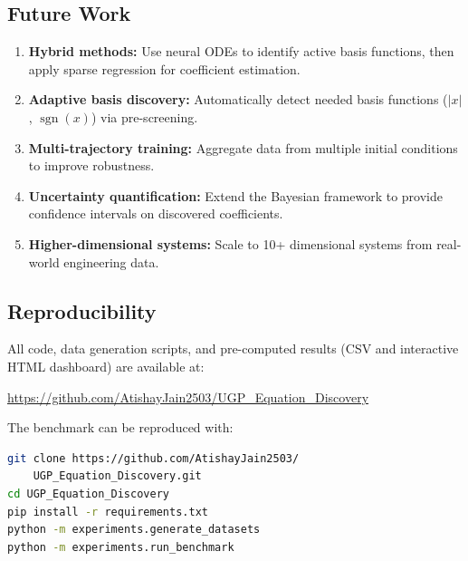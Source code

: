\subsection{Future Work}
\begin{enumerate}
    \item \textbf{Hybrid methods:} Use neural ODEs to identify active basis functions, then apply sparse regression for coefficient estimation.
    \item \textbf{Adaptive basis discovery:} Automatically detect needed basis functions ($|x|$, $\operatorname{sgn}(x)$) via pre-screening.
    \item \textbf{Multi-trajectory training:} Aggregate data from multiple initial conditions to improve robustness.
    \item \textbf{Uncertainty quantification:} Extend the Bayesian framework to provide confidence intervals on discovered coefficients.
    \item \textbf{Higher-dimensional systems:} Scale to 10+ dimensional systems from real-world engineering data.
\end{enumerate}

\subsection{Reproducibility}
All code, data generation scripts, and pre-computed results (CSV and interactive HTML dashboard) are available at:
\begin{center}
\url{https://github.com/AtishayJain2503/UGP_Equation_Discovery}
\end{center}
The benchmark can be reproduced with:
\begin{lstlisting}[language=bash]
git clone https://github.com/AtishayJain2503/
    UGP_Equation_Discovery.git
cd UGP_Equation_Discovery
pip install -r requirements.txt
python -m experiments.generate_datasets
python -m experiments.run_benchmark
\end{lstlisting}
